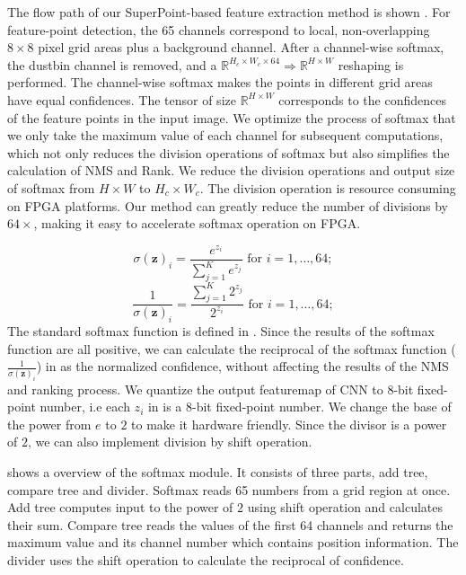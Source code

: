 The flow path of our SuperPoint-based feature extraction method is shown . 
For feature-point detection, the 65 channels correspond to local, non-overlapping $8 \times 8$ pixel grid areas plus a background channel. 
After a channel-wise softmax, the dustbin channel is removed, and a $\mathbb{R}^{H_c\times W_c\times64}\Rightarrow \mathbb{R}^{H\times W}$ reshaping is performed. 
The channel-wise softmax makes the points in different grid areas have equal confidences.
The tensor of size $\mathbb{R}^{H\times W}$ corresponds to the confidences of the feature points in the input image.
We optimize the process of softmax that we only take the maximum value of each channel for subsequent computations, which not only reduces the division operations of softmax but also simplifies the calculation of NMS and Rank.
We reduce the division operations and output size of softmax from $H \times W$ to $H_c \times W_c$.
The division operation is resource consuming on FPGA platforms. 
Our method can greatly reduce the number of divisions by $64 \times$, making it easy to accelerate softmax operation on FPGA.

\begin{equation}
    \sigma (\mathbf {z} )_{i}={\frac {e^{z_{i}}}{\sum _{j=1}^{K}e^{z_{j}}}}{\text{ for }}i=1,\dotsc ,64;
    \label{equ:softmax_o}
\end{equation}
\begin{equation}
    \frac{1}{\sigma (\mathbf {z} )_{i}}={\frac {\sum _{j=1}^{K}2^{z_{j}}}{2^{z_{i}}}}{\text{ for }}i=1,\dotsc ,64;
    \label{equ:softmax_hard}
\end{equation}
The standard softmax function is defined in .
Since the results of the softmax function are all positive, we can calculate the reciprocal of the softmax function ($\frac{1}{\sigma (\mathbf {z} )_{i}}$) in  as the normalized confidence, without affecting the results of the NMS and ranking process. We quantize the output featuremap of CNN to 8-bit fixed-point number, i.e each $z_i$ in  is a 8-bit fixed-point number. We change the base of the power from $e$ to $2$ to make it hardware friendly. Since the divisor is a power of $2$, we can also implement division by shift operation.

 shows a overview of the softmax module. It consists of three parts, add tree, compare tree and divider. Softmax reads 65 numbers from a grid region at once. Add tree computes input to the power of $2$ using shift operation and calculates their sum. Compare tree reads the values of the first 64 channels and returns the maximum value and its channel number which contains position information. The divider uses the shift operation to calculate the reciprocal of confidence.

